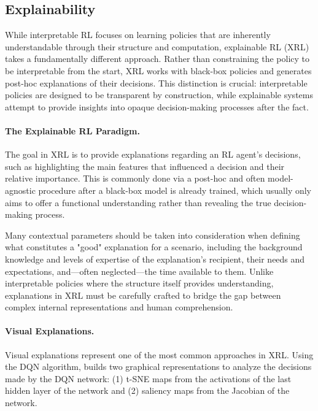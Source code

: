 \subsection{Explainability}
While interpretable RL focuses on learning policies that are inherently understandable through their structure and computation, explainable RL (XRL) takes a fundamentally different approach. Rather than constraining the policy to be interpretable from the start, XRL works with black-box policies and generates post-hoc explanations of their decisions. This distinction is crucial: interpretable policies are designed to be transparent by construction, while explainable systems attempt to provide insights into opaque decision-making processes after the fact.

\paragraph{The Explainable RL Paradigm.}
The goal in XRL is to provide explanations regarding an RL agent's decisions, such as highlighting the main features that influenced a decision and their relative importance. This is commonly done via a post-hoc and often model-agnostic procedure after a black-box model is already trained, which usually only aims to offer a functional understanding rather than revealing the true decision-making process.

Many contextual parameters should be taken into consideration when defining what constitutes a "good" explanation for a scenario, including the background knowledge and levels of expertise of the explanation's recipient, their needs and expectations, and—often neglected—the time available to them. Unlike interpretable policies where the structure itself provides understanding, explanations in XRL must be carefully crafted to bridge the gap between complex internal representations and human comprehension.

\paragraph{Visual Explanations.}
Visual explanations represent one of the most common approaches in XRL. Using the DQN algorithm, \cite{zahavy_graying_2016} builds two graphical representations to analyze the decisions made by the DQN network: (1) t-SNE maps \citep{maaten_visualizing_2008} from the activations of the last hidden layer of the network and (2) saliency maps from the Jacobian of the network. 

